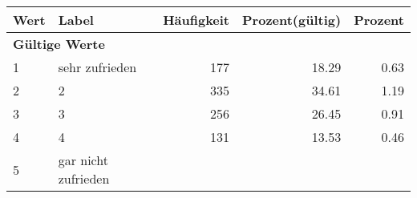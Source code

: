      \begin{longtable}{lXrrr}
     \toprule
     \textbf{Wert} & \textbf{Label} & \textbf{Häufigkeit} & \textbf{Prozent(gültig)} & \textbf{Prozent} \\
     \endhead
     \midrule
     \multicolumn{5}{l}{\textbf{Gültige Werte}}\\

     1 &
     \multicolumn{1}{X}{ sehr zufrieden   } &


       \num{177} &
       \num[round-mode=places,round-precision=2]{18.29} &
         \num[round-mode=places,round-precision=2]{0.63} \\

     2 &
     \multicolumn{1}{X}{ 2   } &


       \num{335} &
       \num[round-mode=places,round-precision=2]{34.61} &
         \num[round-mode=places,round-precision=2]{1.19} \\

     3 &
     \multicolumn{1}{X}{ 3   } &


       \num{256} &
       \num[round-mode=places,round-precision=2]{26.45} &
         \num[round-mode=places,round-precision=2]{0.91} \\

     4 &
     \multicolumn{1}{X}{ 4   } &


       \num{131} &
       \num[round-mode=places,round-precision=2]{13.53} &
         \num[round-mode=places,round-precision=2]{0.46} \\

     5 &
     \multicolumn{1}{X}{ gar nicht zufrieden   } &



\end{longtable}
